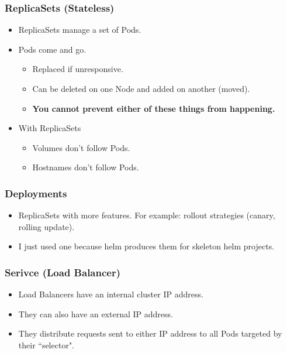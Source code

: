     \begin{frame}
        \frametitle{ReplicaSets (Stateless)}
        \begin{itemize}
            \item ReplicaSets manage a set of Pods.\pause
            \item Pods come and go.\pause
            \begin{itemize}
                \item Replaced if unresponsive.\pause
                \item Can be deleted on one Node and added on another (moved).\pause
                \item \textbf{You cannot prevent either of these things from happening.}\pause
            \end{itemize}
            \item With ReplicaSets\pause
            \begin{itemize}
                \item Volumes don't follow Pods.\pause
                \item Hostnames don't follow Pods.\pause
            \end{itemize}
        \end{itemize}
    \end{frame}

    \begin{frame}
        \frametitle{Deployments}
        \begin{itemize}
            \item ReplicaSets with more features. For example: rollout strategies (canary, rolling update).\pause
            \item I just used one because helm produces them for skeleton helm projects.
        \end{itemize}
    \end{frame}

    \begin{frame}
        \frametitle{Serivce (Load Balancer)}
        \begin{itemize}
            \item Load Balancers have an internal cluster IP address.\pause
            \item They can also have an external IP address.\pause
            \item They distribute requests sent to either IP address to all Pods targeted by their ``selector".
        \end{itemize}
    \end{frame}

